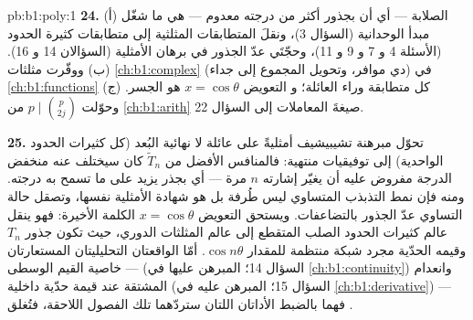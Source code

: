 \begin{solution}{pb:b1:poly:1}
\textbf{24.} (أ) الصلابة --- أي أن  بجذور أكثر من
درجته معدوم --- هي ما شغّل مبدأ الوحدانية
(السؤال 3)، ونقلَ المتطابقات المثلثية إلى
متطابقات كثيرة الحدود (الأسئلة 4 و 7 و 9 و 11)، وحجّتَي
عدّ الجذور في برهان الأمثلية (السؤالان 14
و 16). (ب) ووفّرت مثلثات \cref{ch:b1:complex} (دي موافر،
وتحويل المجموع إلى جداء)  في
\cref{ch:b1:functions} كل متطابقة وراء العائلة؛ و
التعويض $x = \cos\theta$ هو الجسر. (ج) وحوّلت
 $p \mid \binom p{2j}$ من \cref{ch:b1:arith}
صيغةَ المعاملات إلى  السؤال 22.

\textbf{25.} تحوّل مبرهنة تشيبيشيف أمثليةً على
عائلة لا نهائية البُعد (كل كثيرات الحدود الواحدية) إلى
توفيقيات منتهية: فالمنافس الأفضل من $\widetilde T_n$ كان
سيختلف عنه  منخفض الدرجة مفروض عليه أن يغيّر إشارته
$n$ مرة --- أي بجذر يزيد على ما تسمح به درجته. ومنه فإن
نمط التذبذب المتساوي ليس طُرفة بل هو
شهادة الأمثلية نفسها، وتصقل حالة التساوي
عدّ الجذور بالتضاعفات. ويستحق التعويض $x =
\cos\theta$ الكلمة الأخيرة: فهو ينقل عالم كثيرات الحدود
الصلب المتقطع إلى عالم المثلثات الدوري،
حيث تكون جذور $T_n$ وقيمه الحدّية مجرد
شبكة منتظمة للمقدار $\cos n\theta$. أمّا الواقعتان التحليليتان المستعارتان
--- خاصية القيم الوسطى (السؤال 14؛ المبرهن عليها في
\cref{ch:b1:continuity}) وانعدام المشتقة عند قيمة حدّية
داخلية (السؤال 15؛ المبرهن عليه في \cref{ch:b1:derivative})
--- فهما بالضبط الأداتان اللتان ستردّهما تلك الفصول اللاحقة،
فتُغلق .
\end{solution}
